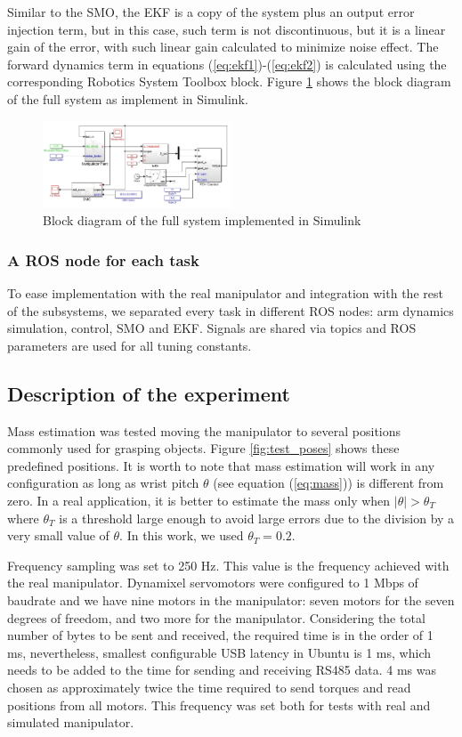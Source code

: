 \documentclass[conference,letterpaper]{ieeeconf}
\begin{document}
Similar to the SMO, the EKF is a copy of the system plus an output error injection term, but in this case, such term is not discontinuous, but it is a linear gain of the error, with such linear gain calculated to minimize noise effect. The forward dynamics term in equations (\ref{eq:ekf1})-(\ref{eq:ekf2}) is calculated using the corresponding Robotics System Toolbox block. Figure \ref{fig:FullSystemSimulink} shows the block diagram of the full system as implement in Simulink. 

\begin{figure}[h!]
  \centering
  \includegraphics[width=0.5\textwidth]{Figures/MassEstimatorDiagram.jpg}
  \caption{Block diagram of the full system implemented in Simulink}
  \label{fig:FullSystemSimulink}
\end{figure}

\subsubsection*{A ROS node for each task}
To ease implementation with the real manipulator and integration with the rest of the subsystems, we separated every task in different ROS nodes: arm dynamics simulation, control, SMO and EKF. Signals are shared via topics and ROS parameters are used for all tuning constants. 

\subsection{Description of the experiment}
Mass estimation was tested moving the manipulator to several positions commonly used for grasping objects. Figure \ref{fig:test_poses} shows these predefined positions. It is worth to note that mass estimation will work in any configuration as long as wrist pitch $\theta$ (see equation (\ref{eq:mass})) is different from zero. In a real application, it is better to estimate the mass only when $\vert\theta\vert > \theta_T$ where $\theta_T$ is a threshold large enough to avoid large errors due to the division by a very small value of $\theta$. In this work, we used $\theta_T=0.2$. 

Frequency sampling was set to 250 Hz. This value is the frequency achieved with the real manipulator. Dynamixel servomotors were configured to 1 Mbps of baudrate and we have nine motors in the manipulator: seven motors for the seven degrees of freedom, and two more for the manipulator. Considering the total number of bytes to be sent and received, the required time is in the order of 1 ms, nevertheless, smallest configurable USB latency in Ubuntu is 1 ms, which needs to be added to the time for sending and receiving RS485 data. 4 ms was chosen as approximately twice the time required to send torques and read positions from all motors. This frequency was set both for tests with real and simulated manipulator. 
\end{document}
